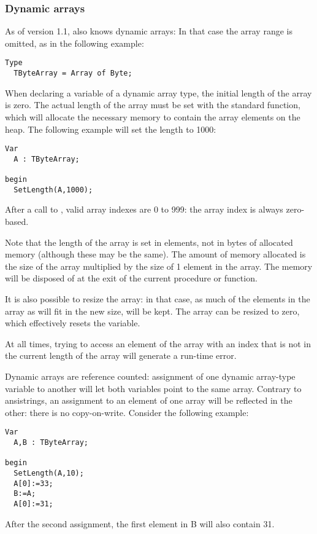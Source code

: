 \subsubsection{Dynamic arrays}
As of version 1.1, \fpc also knows dynamic arrays: In that case the array
range is omitted, as in the following example:
\begin{verbatim}
Type
  TByteArray = Array of Byte;
\end{verbatim}
When declaring a variable of a dynamic array type, the initial length of the
array is zero. The actual length of the array must be set with the standard
 function, which will allocate the necessary memory to contain 
the array elements on the heap. The following example will set the length to
1000:
\begin{verbatim}
Var 
  A : TByteArray;

begin
  SetLength(A,1000);
\end{verbatim}
After a call to , valid array indexes are 0 to 999: the array
index is always zero-based.

Note that the length of the array is set in elements, not in bytes of 
allocated memory (although these may be the same). The amount of 
memory allocated is the size of the array multiplied by the size of 
1 element in the array. The memory will be disposed of at the exit of the
current procedure or function. 

It is also possible to resize the array: in that case, as much of the 
elements in the array as will fit in the new size, will be kept. The array
can be resized to zero, which effectively resets the variable.

At all times, trying to access an element of the array with an index 
that is not in the current length of the array will generate a run-time 
error.

Dynamic arrays are reference counted: assignment of one dynamic array-type 
variable to another will let both variables point to the same array. 
Contrary to ansistrings, an assignment to an element of one array will 
be reflected in the other: there is no copy-on-write. Consider the following
example:
\begin{verbatim}
Var
  A,B : TByteArray;

begin
  SetLength(A,10);
  A[0]:=33;
  B:=A;
  A[0]:=31;
\end{verbatim}
After the second assignment, the first element in B will also contain 31.

